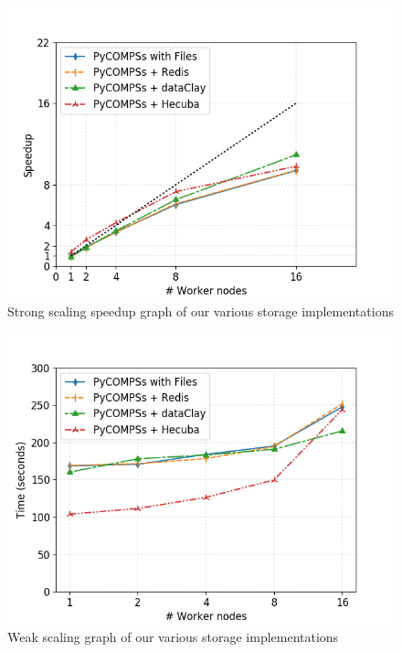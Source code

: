 \begin{figure}[ht!]
\centering
\includegraphics[scale = 0.5]{figures/storage/kmeans_strong_speedup.png}
\caption{Strong scaling speedup graph of our various storage implementations}
\label{fig:kmeans_strong_speedup_redis}
\end{figure}


\begin{figure}[ht!]
\centering
\includegraphics[scale = 0.5]{figures/storage/kmeans_weak.png}
\caption{Weak scaling graph of our various storage implementations}
\label{fig:kmeans_weak_redis}
\end{figure}



